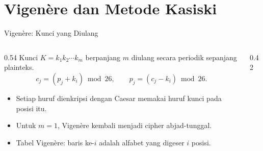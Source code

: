 \documentclass[aspectratio=169,11pt]{beamer}
\begin{document}
\section{Vigen\`ere dan Metode Kasiski}

\begin{frame}{Vigen\`ere: Kunci yang Diulang}
    \begin{columns}[T,onlytextwidth]
        \begin{column}{0.54\textwidth}
            \footnotesize
            Kunci $K=k_1k_2\cdots k_m$ berpanjang $m$ diulang secara periodik
            sepanjang plainteks.
            \[
                c_j=(p_j+k_i)\bmod 26,
                \qquad
                p_j=(c_j-k_i)\bmod 26.
            \]
            \begin{itemize}
                \item Setiap huruf dienkripsi dengan Caesar memakai huruf kunci
                      pada posisi itu.
                \item Untuk $m=1$, Vigen\`ere kembali menjadi cipher
                      abjad-tunggal.
                \item Tabel Vigen\`ere: baris ke-$i$ adalah alfabet yang
                      digeser $i$ posisi.
            \end{itemize}
        \end{column}
        \begin{column}{0.42\textwidth}
            \centering
        \end{column}
    \end{columns}
\end{frame}
\end{document}
